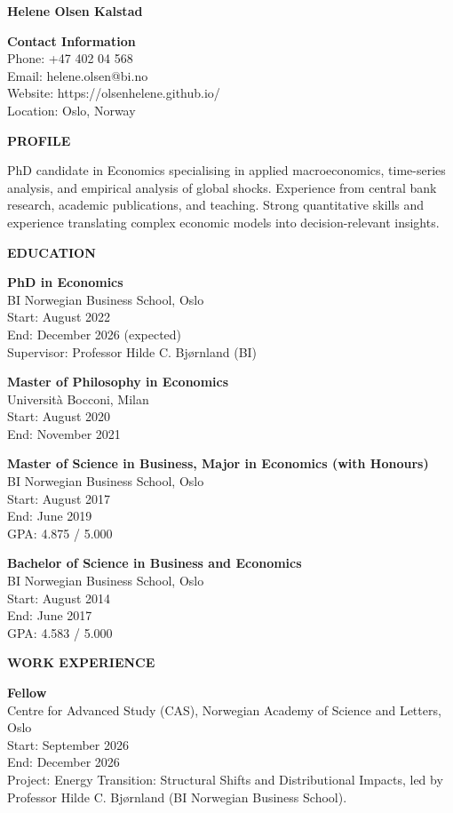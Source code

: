 \documentclass[11pt,a4paper]{article}
\begin{document}
\begin{center}
{\Large \textbf{Helene Olsen Kalstad}}
\end{center}

\textbf{Contact Information}\\
Phone: +47 402 04 568\\
Email: helene.olsen@bi.no\\
Website: https://olsenhelene.github.io/\\
Location: Oslo, Norway

\bigskip
\textbf{PROFILE}

PhD candidate in Economics specialising in applied macroeconomics, time-series analysis, and empirical analysis of global shocks. Experience from central bank research, academic publications, and teaching. Strong quantitative skills and experience translating complex economic models into decision-relevant insights.

\bigskip
\textbf{EDUCATION}

\textbf{PhD in Economics}\\
BI Norwegian Business School, Oslo\\
Start: August 2022\\
End: December 2026 (expected)\\
Supervisor: Professor Hilde C. Bjørnland (BI)

\textbf{Master of Philosophy in Economics}\\
Università Bocconi, Milan\\
Start: August 2020\\
End: November 2021

\textbf{Master of Science in Business, Major in Economics (with Honours)}\\
BI Norwegian Business School, Oslo\\
Start: August 2017\\
End: June 2019\\
GPA: 4.875 / 5.000

\textbf{Bachelor of Science in Business and Economics}\\
BI Norwegian Business School, Oslo\\
Start: August 2014\\
End: June 2017\\
GPA: 4.583 / 5.000

\bigskip
\textbf{WORK EXPERIENCE}

\textbf{Fellow}\\
Centre for Advanced Study (CAS), Norwegian Academy of Science and Letters, Oslo\\
Start: September 2026\\
End: December 2026\\
Project: Energy Transition: Structural Shifts and Distributional Impacts, led by Professor Hilde C. Bjørnland (BI Norwegian Business School).
\end{document}
